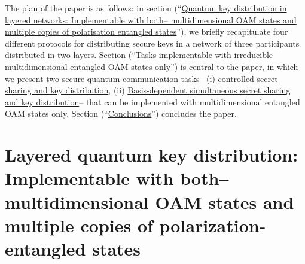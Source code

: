 \documentclass[fleqn,10pt]{wlscirep}
\begin{document}
The plan of the paper is as follows: in section (``\hyperlink{Quantum key distribution in layered networks: Existing protocols}{Quantum key distribution in layered networks: Implementable with both-- multidimensional  OAM states and multiple copies of polarisation entangled states}''), we briefly recapitulate four different protocols for distributing secure keys in a network of three participants distributed in two layers.  Section (``\hyperlink{Tasks implementable with irreducible multidimensional entangled OAM states only}{Tasks implementable with irreducible multidimensional entangled OAM states only}'') is central to the paper, in which we present two secure quantum communication tasks-- (i) \hyperlink{controlled-secret sharing and key distribution}{controlled-secret sharing and key distribution}, (ii) \hyperlink{Basis-dependent 
 simultaneous secret sharing and key distribution}{Basis-dependent simultaneous secret sharing and key distribution}-- that can be  implemented with multidimensional entangled OAM states only. Section (``\hyperlink{Conclusions}{Conclusions}'') concludes the paper.




\section*{Layered quantum key distribution: Implementable with both-- multidimensional OAM states and multiple copies of polarization-entangled states}
\label{formalism}
\hypertarget{Quantum key distribution in layered networks: Existing protocols}{}
\end{document}
